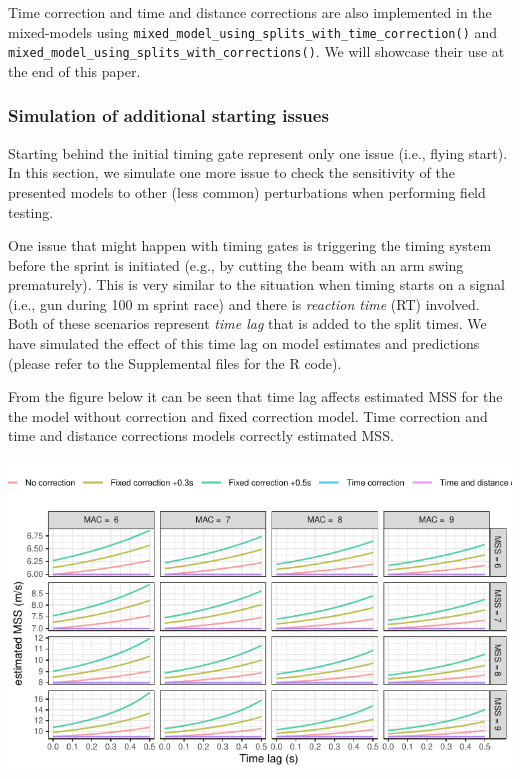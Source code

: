 \documentclass[fleqn,10pt,lineno]{wlpeerj} %
\begin{document}
Time correction and time and distance corrections are also implemented in the mixed-models using \texttt{mixed\_model\_using\_splits\_with\_time\_correction()} and \texttt{mixed\_model\_using\_splits\_with\_corrections()}. We will showcase their use at the end of this paper.

\hypertarget{simulation-of-additional-starting-issues}{%
\subsubsection{Simulation of additional starting issues}\label{simulation-of-additional-starting-issues}}

Starting behind the initial timing gate represent only one issue (i.e., flying start). In this section, we simulate one more issue to check the sensitivity of the presented models to other (less common) perturbations when performing field testing.

One issue that might happen with timing gates is triggering the timing system before the sprint is initiated (e.g., by cutting the beam with an arm swing prematurely). This is very similar to the situation when timing starts on a signal (i.e., gun during 100 m sprint race) and there is \emph{reaction time} (RT) involved. Both of these scenarios represent \emph{time lag} that is added to the split times. We have simulated the effect of this time lag on model estimates and predictions (please refer to the Supplemental files for the R code).

From the figure below it can be seen that time lag affects estimated MSS for the the model without correction and fixed correction model. Time correction and time and distance corrections models correctly estimated MSS.

\begin{center}\includegraphics[width=0.9\linewidth]{paper_files/figure-latex/unnamed-chunk-44-1} \end{center}
\end{document}

